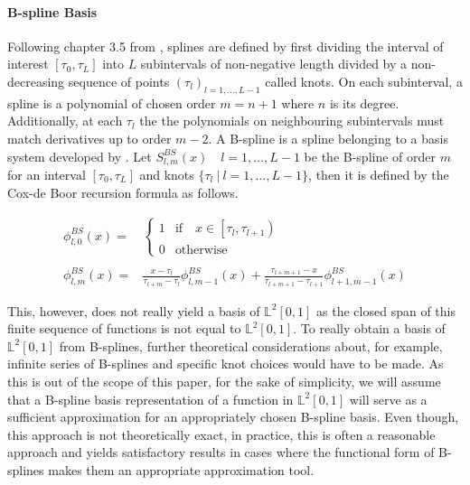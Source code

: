 \documentclass[11pt,twoside,a4paper]{article}
\begin{document}
	\paragraph{B-spline Basis} Following chapter 3.5 from \cite{ramsay_functional_2005}, splines are defined by first dividing the interval of interest $[\tau_0, \tau_L]$ into $L$ subintervals of non-negative length divided by a non-decreasing sequence of points $(\tau_l)_{l = 1,\dots, L-1}$ called knots. On each subinterval, a spline is a polynomial of chosen order $m = n+1$ where $n$ is its degree. Additionally, at each $\tau_l$ the the polynomials on neighbouring subintervals must match derivatives up to order $m-2$.
	A B-spline is a spline belonging to a basis system developed by \cite{de_boor_practical_1978}. Let $S_{l,m}^{BS}(x) \quad l = 1,\dots,L-1$ be the B-spline of order $m$ for an interval $[\tau_0, \tau_L]$ and knots $\{\tau_l \: \vert \: l = 1,\dots, L-1\}$, then it is defined by the Cox-de Boor recursion formula as follows. 

	\begin{equation}
		\begin{split}
			\phi_{l,0}^{BS}(x) = &
			\begin{cases}
				1 & \text{if} \quad x \in \left[\tau_l, \tau_{l+1}\right)\\
				0 & \text{otherwise}
			\end{cases}\\ \\
			\phi_{l,m}^{BS}(x) = &\frac{x - \tau_l}{\tau_{l+m} - \tau_l} \phi_{l,m-1}^{BS}(x) + \frac{\tau_{l+m+1} - x}{\tau_{l+m+1} - \tau_{l+1}} \phi_{l+1,m-1}^{BS}(x)
		\end{split}
	\end{equation}
	
	This, however, does not really yield a basis of $\mathbb{L}^2[0,1]$ as the closed span of this finite sequence of functions is not equal to $\mathbb{L}^2[0,1]$. To really obtain a basis of $\mathbb{L}^2[0,1]$ from B-splines, further theoretical considerations about, for example, infinite series of B-splines and specific knot choices would have to be made. As this is out of the scope of this paper, for the sake of simplicity, we will assume that a B-spline basis representation of a function in $\mathbb{L}^2[0,1]$ will serve as a sufficient approximation for an appropriately chosen B-spline basis. 
	Even though, this approach is not theoretically exact, in practice, this is often a reasonable approach and yields satisfactory results in cases where the functional form of B-splines makes them an appropriate approximation tool. 
	
\end{document}
